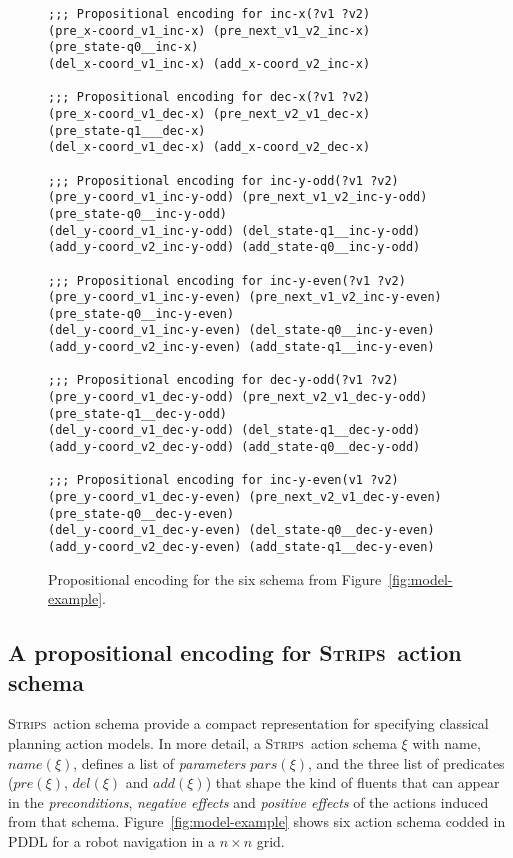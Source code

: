 \documentclass[letterpaper]{article} %
\newcommand{\strips}{\textsc{Strips}}     %
\begin{document}
\begin{figure}
\begin{tiny}
\begin{verbatim}
;;; Propositional encoding for inc-x(?v1 ?v2)
(pre_x-coord_v1_inc-x) (pre_next_v1_v2_inc-x) 
(pre_state-q0__inc-x)
(del_x-coord_v1_inc-x) (add_x-coord_v2_inc-x)

;;; Propositional encoding for dec-x(?v1 ?v2)
(pre_x-coord_v1_dec-x) (pre_next_v2_v1_dec-x) 
(pre_state-q1___dec-x)
(del_x-coord_v1_dec-x) (add_x-coord_v2_dec-x)

;;; Propositional encoding for inc-y-odd(?v1 ?v2)
(pre_y-coord_v1_inc-y-odd) (pre_next_v1_v2_inc-y-odd) 
(pre_state-q0__inc-y-odd)
(del_y-coord_v1_inc-y-odd) (del_state-q1__inc-y-odd)
(add_y-coord_v2_inc-y-odd) (add_state-q0__inc-y-odd)

;;; Propositional encoding for inc-y-even(?v1 ?v2)
(pre_y-coord_v1_inc-y-even) (pre_next_v1_v2_inc-y-even)
(pre_state-q0__inc-y-even)
(del_y-coord_v1_inc-y-even) (del_state-q0__inc-y-even)
(add_y-coord_v2_inc-y-even) (add_state-q1__inc-y-even)

;;; Propositional encoding for dec-y-odd(?v1 ?v2)
(pre_y-coord_v1_dec-y-odd) (pre_next_v2_v1_dec-y-odd)
(pre_state-q1__dec-y-odd)
(del_y-coord_v1_dec-y-odd) (del_state-q1__dec-y-odd)
(add_y-coord_v2_dec-y-odd) (add_state-q0__dec-y-odd)

;;; Propositional encoding for inc-y-even(v1 ?v2)
(pre_y-coord_v1_dec-y-even) (pre_next_v2_v1_dec-y-even)
(pre_state-q0__dec-y-even)
(del_y-coord_v1_dec-y-even) (del_state-q0__dec-y-even)
(add_y-coord_v2_dec-y-even) (add_state-q1__dec-y-even)
\end{verbatim}
\end{tiny}
 \caption{\small Propositional encoding for the six schema from Figure~\ref{fig:model-example}.}
\label{fig:encoding}
\end{figure}

\subsection{A propositional encoding for \strips\ action schema}
\strips\ action schema provide a compact representation for specifying classical planning action models. In more detail, a \strips\ action schema $\xi$ with name, $name(\xi)$, defines a list of {\em parameters} $pars(\xi)$, and the three list of predicates ($pre(\xi)$, $del(\xi)$ and $add(\xi)$) that shape the kind of fluents that can appear in the {\em preconditions}, {\em negative effects} and {\em positive effects} of the actions induced from that schema. Figure~\ref{fig:model-example} shows six action schema codded in PDDL for a robot navigation in a $n\times n$ grid. 
\end{document}
